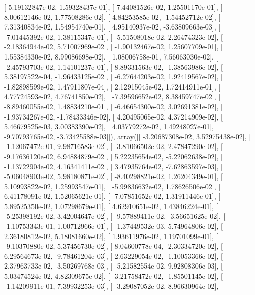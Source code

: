 \documentclass{article}
\begin{document}
       [  5.19132847e-02,   1.59328437e-01],
       [  7.44081526e-02,   1.25501170e-01],
       [  8.00612146e-02,   1.77508286e-02],
       [  4.84253585e-02,  -1.54452712e-02],
       [  7.31340834e-02,   1.54954740e-01],
       [  4.95140937e-02,  -3.63809663e-03],
       [ -7.01445392e-02,   1.38115347e-01],
       [ -5.51508018e-02,   2.26474323e-02],
       [ -2.18364944e-02,   5.71007969e-02],
       [ -1.90132467e-02,   1.25607709e-01],
       [  1.55384330e-02,   8.99086698e-02],
       [  1.08006758e-01,   7.56063030e-02],
       [ -2.45793703e-02,   1.14101237e-01],
       [  8.89331563e-02,  -1.38563986e-02],
       [  5.38197522e-04,  -1.96433125e-02],
       [ -6.27644203e-02,   1.92419567e-02],
       [ -1.82898599e-02,   1.47911807e-04],
       [  2.12915045e-02,   1.72414911e-01],
       [  4.77724593e-02,   4.76741850e-02],
       [ -7.39596652e-02,   8.38459747e-02],
       [ -8.89460055e-02,   1.48834210e-01],
       [ -6.46654300e-02,   3.02691381e-02],
       [ -1.93734267e-02,  -1.78433346e-02],
       [  4.20495065e-02,   4.37214909e-02],
       [  5.46679525e-03,   3.00383390e-02],
       [  4.03779272e-02,   1.49248027e-01],
       [ -9.70793765e-02,  -3.73425588e-03]]), array([[ -3.20687308e-02,   3.52975438e-02],
       [ -1.12067472e-01,   9.98716583e-02],
       [ -3.81066502e-02,   2.47847290e-02],
       [ -9.17636120e-02,   6.94884879e-02],
       [  5.22235654e-02,  -5.22062638e-02],
       [ -1.13722904e-02,   4.16341411e-02],
       [  3.47935764e-02,  -7.62863597e-03],
       [ -5.06048903e-02,   5.98180871e-02],
       [ -8.40298821e-02,   1.26204349e-01],
       [  5.10993822e-02,   1.25993547e-01],
       [ -5.99836632e-02,   1.78626506e-02],
       [  6.41178091e-02,   1.52065621e-01],
       [ -7.07851652e-02,   1.31911446e-01],
       [  5.89525350e-02,   1.07298679e-01],
       [  4.62910651e-02,   1.43846224e-01],
       [ -5.25398192e-02,   3.42004647e-02],
       [ -9.57889411e-02,  -3.56651625e-02],
       [ -1.10753343e-01,   1.00712966e-01],
       [ -1.37449532e-03,   5.74964806e-02],
       [  2.36180812e-02,   5.18081660e-02],
       [  1.93611976e-02,   1.19701099e-01],
       [ -9.10370880e-02,   5.37456730e-02],
       [  8.04600778e-04,  -2.30334720e-02],
       [  6.29564673e-02,  -9.78461204e-03],
       [  2.63229054e-02,  -1.10053366e-02],
       [  2.37963733e-02,  -3.50269768e-03],
       [ -5.21582554e-02,   9.92808306e-03],
       [  5.03474524e-02,   4.82309675e-02],
       [ -3.21758472e-02,  -1.85501145e-02],
       [ -1.14209911e-01,   7.39932253e-03],
       [ -3.29087052e-02,   8.96630964e-02],
\end{document}
